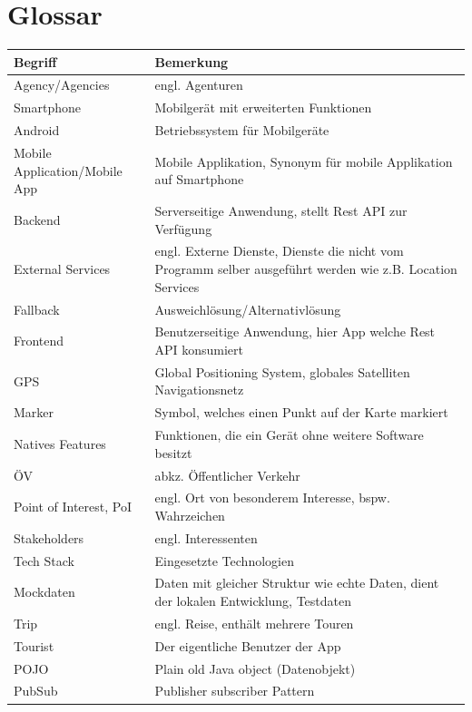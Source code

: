 \documentclass[a4paper,10pt,xetex]{article}
\begin{document}
\section{Glossar}\label{glossar}
\begin{longtabu} to \textwidth { | l | X[l] | }
\hline
\textbf{Begriff} & \textbf{Bemerkung}\\\hline
\endhead

Agency/Agencies & engl. Agenturen\\\hline
Smartphone & Mobilgerät mit erweiterten Funktionen\\\hline
Android & Betriebssystem für Mobilgeräte\\\hline
Mobile Application/Mobile App & Mobile Applikation, Synonym für mobile Applikation auf Smartphone\\\hline
Backend & Serverseitige Anwendung, stellt Rest API zur Verfügung\\\hline
External Services & engl. Externe Dienste, Dienste die nicht vom Programm selber ausgeführt werden wie z.B. Location Services\\\hline
Fallback & Ausweichlösung/Alternativlösung\\\hline
Frontend & Benutzerseitige Anwendung, hier App welche Rest API konsumiert\\\hline
GPS & Global Positioning System, globales Satelliten Navigationsnetz\\\hline
Marker & Symbol, welches einen Punkt auf der Karte markiert\\\hline
Natives Features & Funktionen, die ein Gerät ohne weitere Software besitzt\\\hline
ÖV & abkz. Öffentlicher Verkehr\\\hline
Point of Interest, PoI & engl. Ort von besonderem Interesse, bspw. Wahrzeichen\\\hline
Stakeholders & engl. Interessenten\\\hline
Tech Stack & Eingesetzte Technologien\\\hline
Mockdaten & Daten mit gleicher Struktur wie echte Daten, dient der lokalen Entwicklung, Testdaten \\\hline
Trip & engl. Reise, enthält mehrere Touren\\\hline
Tourist & Der eigentliche Benutzer der App\\\hline
POJO & Plain old Java object (Datenobjekt)\\\hline
PubSub & Publisher subscriber Pattern\\\hline
\end{longtabu}
\end{document}
